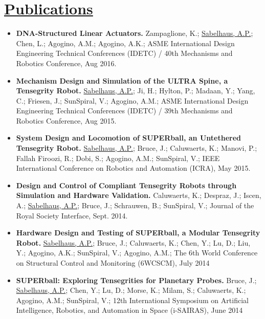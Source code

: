 \documentclass[letterpaper]{deedy-resume} %
\begin{document}
\begin{minipage}[t]{1\textwidth}%
\vspace{0.4cm}
  
\section{\underline{Publications}}


\begin{itemize}

\item \textbf{DNA-Structured Linear Actuators.} Zampaglione, K.; \underline{Sabelhaus, A.P.};  Chen, L.;  Agogino, A.M.;  Agogino, A.K.;  ASME International Design Engineering Technical Conferences (IDETC) / 40th Mechanisms and Robotics Conference, Aug 2016.
  
\item \textbf{Mechanism Design and Simulation of the ULTRA Spine, a Tensegrity Robot.} \underline{Sabelhaus, A.P.}; Ji, H.; Hylton, P.; Madaan, Y.; Yang, C.; Friesen, J.; SunSpiral, V.; Agogino, A.M.; ASME International Design Engineering Technical Conferences (IDETC) / 39th Mechanisms and Robotics Conference, Aug 2015.

\item \textbf{System Design and Locomotion of SUPERball, an Untethered Tensegrity Robot.} \underline{Sabelhaus, A.P.}; Bruce, J.; Caluwaerts, K.; Manovi, P.; Fallah Firoozi, R.; Dobi, S.; Agogino, A.M.; SunSpiral, V.; IEEE International Conference on Robotics and Automation (ICRA), May 2015.

\item \textbf{Design and Control of Compliant Tensegrity Robots through Simulation and Hardware Validation.} Caluwaerts, K.; Despraz, J.; Iscen, A.; \underline{Sabelhaus, A.P.}; Bruce, J.; Schrauwen, B.; SunSpiral, V.;  Journal of the Royal Society Interface, Sept. 2014.

\item \textbf{Hardware Design and Testing of SUPERball, a Modular Tensegrity Robot.} \underline{Sabelhaus, A.P.}; Bruce, J.; Caluwaerts, K.; Chen, Y.; Lu, D.; Liu, Y.; Agogino, A.K.; SunSpiral, V.; Agogino, A.M.; The 6th World Conference on Structural Control and Monitoring (6WCSCM), July 2014

\item \textbf{SUPERball: Exploring Tensegrities for Planetary Probes.} Bruce, J.; \underline{Sabelhaus, A.P.}; Chen, Y.; Lu, D.; Morse, K.; Milam, S.; Caluwaerts, K.; Agogino, A.M.; SunSpiral, V.; 12th International Symposium on Artificial Intelligence, Robotics, and Automation in Space (i-SAIRAS), June 2014


\end{itemize}
\end{minipage}
\end{document}
